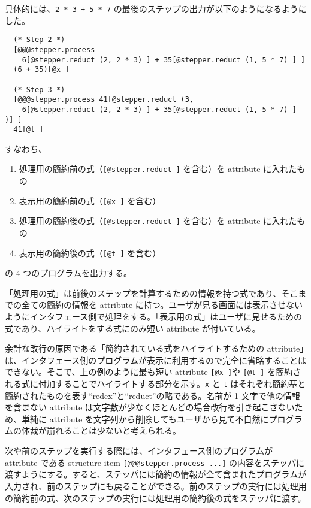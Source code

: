 具体的には、\texttt{2 * 3 + 5 * 7} の最後のステップの出力が以下のようになるようにした。
\begin{verbatim}
  (* Step 2 *)
  [@@@stepper.process
    6[@stepper.reduct (2, 2 * 3) ] + 35[@stepper.reduct (1, 5 * 7) ] ]
  (6 + 35)[@x ]

  (* Step 3 *)
  [@@@stepper.process 41[@stepper.reduct (3,
    6[@stepper.reduct (2, 2 * 3) ] + 35[@stepper.reduct (1, 5 * 7) ] )] ]
  41[@t ]
\end{verbatim}
すなわち、
\begin{enumerate}
\item 処理用の簡約前の式（\texttt{[@stepper.reduct ]} を含む）を attribute に入れたもの
\item 表示用の簡約前の式（\texttt{[@x ]} を含む）
\item 処理用の簡約後の式（\texttt{[@stepper.reduct ]} を含む）を attribute に入れたもの
\item 表示用の簡約後の式（\texttt{[@t ]} を含む）
\end{enumerate}
の 4 つのプログラムを出力する。

「処理用の式」は前後のステップを計算するための情報を持つ式であり、そこまでの全ての簡約の情報を attribute に持つ。ユーザが見る画面には表示させないようにインタフェース側で処理をする。「表示用の式」はユーザに見せるための式であり、ハイライトをする式にのみ短い attribute が付いている。

余計な改行の原因である「簡約されている式をハイライトするための attribute」は、インタフェース側のプログラムが表示に利用するので完全に省略することはできない。そこで、上の例のように最も短い attribute \texttt{[@x ]}や \texttt{[@t ]} を簡約される式に付加することでハイライトする部分を示す。\texttt{x} と \texttt{t} はそれぞれ簡約基と簡約されたものを表す``redex''と``reduct''の略である。名前が 1 文字で他の情報を含まない attribute は文字数が少なくほとんどの場合改行を引き起こさないため、単純に attribute を文字列から削除してもユーザから見て不自然にプログラムの体裁が崩れることは少ないと考えられる。

次や前のステップを実行する際には、インタフェース側のプログラムが attribute である structure item \texttt{[@@@stepper.process ...]} の内容をステッパに渡すようにする。すると、ステッパには簡約の情報が全て含まれたプログラムが入力され、前のステップにも戻ることができる。前のステップの実行には処理用の簡約前の式、次のステップの実行には処理用の簡約後の式をステッパに渡す。
